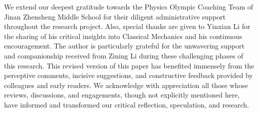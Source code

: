 \documentclass{article}
\begin{document}
We extend our deepest gratitude towards the Physics Olympic Coaching Team of Jinan Zhensheng Middle School for their diligent administrative support throughout the research project. Also, special thanks are given to Yinxian Li for the sharing of his critical insights into Classical Mechanics and his continuous encouragement. The author is particularly grateful for the unwavering support and companionship received from Zining Li during these challenging phases of this research. This revised version of this paper has benefited immensely from the perceptive comments, incisive suggestions, and constructive feedback provided by colleagues and early readers. We acknowledge with appreciation all those whose reviews, discussions, and engagements, though not explicitly mentioned here, have informed and transformed our critical reflection, speculation, and research.

 

\end{document}
